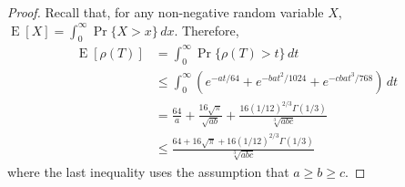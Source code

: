 \documentclass[a4paper,UKenglish]{lipics-v2016}
\DeclareMathOperator{\E}{E}
\begin{document}
\begin{proof}
   Recall that, for any non-negative random variable $X$, $\E[X]=\int_0^{\infty} \Pr\{X>x\}\,dx$.  Therefore,
  \begin{align*}
    \E[\rho(T)] & = \int_0^{\infty} \Pr\{\rho(T)>t\}\,dt \\
                & \le \int_0^{\infty}\left( e^{-at/64} + e^{-bat^2/1024} + e^{-cbat^3/768}\right)\,dt \\
                & = \frac{64}{a} + \frac{16\sqrt{\pi}}{\sqrt{ab}} + \frac{16(1/12)^{2/3}\Gamma(1/3)}{\sqrt[3]{abc}} \\
                & \le \frac{64 + 16\sqrt{\pi} + 16(1/12)^{2/3}\Gamma(1/3)}{\sqrt[3]{abc}}
  \end{align*}
  where the last inequality uses the assumption that $a\ge b\ge c$.
\end{proof}
\end{document}
